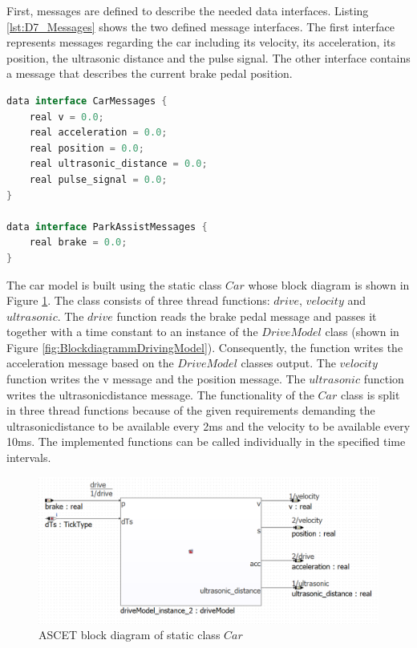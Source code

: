 First, messages are defined to describe the needed data interfaces. Listing \ref{lst:D7_Messages} shows the two defined message interfaces. The first interface represents messages regarding the car including its velocity, its acceleration, its position, the ultrasonic distance and the pulse signal. The other interface contains a message that describes the current brake pedal position.

\begin{lstlisting}[language=Java,basicstyle=\scriptsize, caption= Defined messages in ASCET,label= lst:D7_Messages]
data interface CarMessages {
	real v = 0.0;
	real acceleration = 0.0;
	real position = 0.0;
	real ultrasonic_distance = 0.0;
	real pulse_signal = 0.0;
}

data interface ParkAssistMessages {
	real brake = 0.0;
}
\end{lstlisting}

The car model is built using the static class $Car$ whose block diagram is shown in Figure \ref{fig:BlockdiagrammCar}. The class consists of three thread functions: $drive$, $velocity$ and $ultrasonic$. The $drive$ function reads the brake pedal message and passes it together with a time constant to an instance of the $DriveModel$ class (shown in Figure \ref{fig:BlockdiagrammDrivingModel}). Consequently, the function writes the acceleration message based on the $DriveModel$ classes output. The $velocity$ function writes the v message and the position message. The $ultrasonic$ function writes the ultrasonic\textunderscore distance message. The functionality of the $Car$ class is split in three thread functions because of the given requirements demanding the ultrasonic\textunderscore distance to be available every 2ms and the velocity to be available every 10ms. The implemented functions can be called individually in the specified time intervals.

\begin{figure}[H]
\centering
\includegraphics[width=1\textwidth]{images/Blockdiagramm_car.png}
\caption{ASCET block diagram of static class $Car$}
\label{fig:BlockdiagrammCar}
\end{figure}

